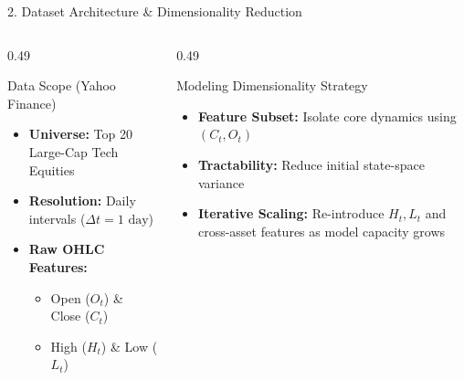 \documentclass[aspectratio=169,10pt]{beamer}
\begin{document}
\begin{frame}{2. Dataset Architecture \& Dimensionality Reduction}
\begin{columns}[T]
\begin{column}{0.49\textwidth}
\begin{block}{Data Scope (Yahoo Finance)}
\begin{itemize}
\item \textbf{Universe:} Top 20 Large-Cap Tech Equities
\item \textbf{Resolution:} Daily intervals ($\Delta t=1\text{ day}$)
\item \textbf{Raw OHLC Features:}
\begin{itemize}
\item Open ($O_t$) \& Close ($C_t$)
\item High ($H_t$) \& Low ($L_t$)
\end{itemize}
\end{itemize}
\end{block}
\end{column}
\begin{column}{0.49\textwidth}
\begin{block}{Modeling Dimensionality Strategy}
\begin{itemize}
\item \textbf{Feature Subset:} Isolate core dynamics using $(C_t,O_t)$
\item \textbf{Tractability:} Reduce initial state-space variance
\item \textbf{Iterative Scaling:} Re-introduce $H_t,L_t$ and cross-asset features as model capacity grows
\end{itemize}
\end{block}
\end{column}
\end{columns}
\end{frame}
\end{document}
